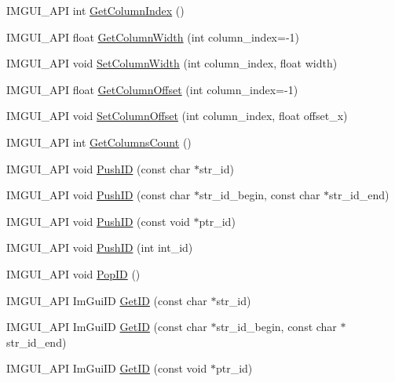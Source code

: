 \begin{DoxyCompactItemize}
\item 
I\+M\+G\+U\+I\+\_\+\+A\+PI int \hyperlink{namespace_im_gui_acc31f8eea4fcfb86edeb3ac12d82fc05}{Get\+Column\+Index} ()
\item 
I\+M\+G\+U\+I\+\_\+\+A\+PI float \hyperlink{namespace_im_gui_a3d205d86dab5ca0763a92997283ac36e}{Get\+Column\+Width} (int column\+\_\+index=-\/1)
\item 
I\+M\+G\+U\+I\+\_\+\+A\+PI void \hyperlink{namespace_im_gui_af17222ec47aebb5ede00be7b52de9f5d}{Set\+Column\+Width} (int column\+\_\+index, float width)
\item 
I\+M\+G\+U\+I\+\_\+\+A\+PI float \hyperlink{namespace_im_gui_a79c22e9c5c208b6c9534a273be71a9e6}{Get\+Column\+Offset} (int column\+\_\+index=-\/1)
\item 
I\+M\+G\+U\+I\+\_\+\+A\+PI void \hyperlink{namespace_im_gui_a8cc207211d6cf3f77b505e24aed4ebcc}{Set\+Column\+Offset} (int column\+\_\+index, float offset\+\_\+x)
\item 
I\+M\+G\+U\+I\+\_\+\+A\+PI int \hyperlink{namespace_im_gui_a3c2998ad9527948a4e4166c4f7db9ec9}{Get\+Columns\+Count} ()
\item 
I\+M\+G\+U\+I\+\_\+\+A\+PI void \hyperlink{namespace_im_gui_a27a8533605dc5b8cabf161bf7715bbde}{Push\+ID} (const char $\ast$str\+\_\+id)
\item 
I\+M\+G\+U\+I\+\_\+\+A\+PI void \hyperlink{namespace_im_gui_af5e55788830807a7c53d5dd7865b692a}{Push\+ID} (const char $\ast$str\+\_\+id\+\_\+begin, const char $\ast$str\+\_\+id\+\_\+end)
\item 
I\+M\+G\+U\+I\+\_\+\+A\+PI void \hyperlink{namespace_im_gui_af9cf42fdf2fbc5eeec7521de14996bfb}{Push\+ID} (const void $\ast$ptr\+\_\+id)
\item 
I\+M\+G\+U\+I\+\_\+\+A\+PI void \hyperlink{namespace_im_gui_a6a11664be2a0b9a0e7054bb339e009ac}{Push\+ID} (int int\+\_\+id)
\item 
I\+M\+G\+U\+I\+\_\+\+A\+PI void \hyperlink{namespace_im_gui_aba0b2d8f890a5d435ae43d0c4a2d4dd1}{Pop\+ID} ()
\item 
I\+M\+G\+U\+I\+\_\+\+A\+PI Im\+Gui\+ID \hyperlink{namespace_im_gui_a3329b04bd4235e90ad9deb00ffb38ae4}{Get\+ID} (const char $\ast$str\+\_\+id)
\item 
I\+M\+G\+U\+I\+\_\+\+A\+PI Im\+Gui\+ID \hyperlink{namespace_im_gui_a26064d74efebef3aa86e1a78b3e4c333}{Get\+ID} (const char $\ast$str\+\_\+id\+\_\+begin, const char $\ast$str\+\_\+id\+\_\+end)
\item 
I\+M\+G\+U\+I\+\_\+\+A\+PI Im\+Gui\+ID \hyperlink{namespace_im_gui_a220123ad62c2180ded92b2ef91f27c5a}{Get\+ID} (const void $\ast$ptr\+\_\+id)

\end{DoxyCompactItemize}

